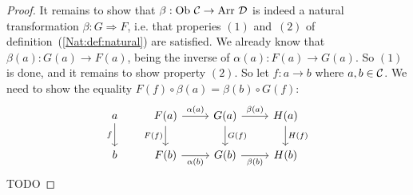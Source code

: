\begin{proof}
    It remains to show that $\beta:\mbox{\rm Ob}\ \mbox{$\cal C$}\to\mbox{\rm Arr}\ \mbox{$\cal D$}$ is indeed
    a natural transformation $\beta:G\Rightarrow F$, i.e. that properies 
    $(1)$ and~$(2)$ of definition~(\ref{Nat:def:natural}) are satisfied. 
    We already know that $\beta(a):G(a)\to F(a)$, being the inverse
    of $\alpha(a):F(a)\to G(a)$. So $(1)$ is done, and it remains to
    show property $(2)$. So let $f:a\to b$ where $a,b\in\mbox{$\cal C$}$.
    We need to show the equality $F(f)\circ\beta(a)=\beta(b)\circ G(f)$:
    \[
        \begin{tikzcd}
            a\arrow[d,swap, "f"]
            &F(a)\arrow[r, "\alpha(a)"]\arrow[d, swap,"F(f)"]
            &G(a)\arrow[r,"\beta(a)"]\arrow[d, "G(f)"]
            &H(a)\arrow[d, "H(f)"]
            \\
            b
            &F(b)\arrow[r, swap, "\alpha(b)"]
            &G(b)\arrow[r, swap, "\beta(b)"]
            &H(b)
        \end{tikzcd}
    \]
    TODO
\end{proof}

